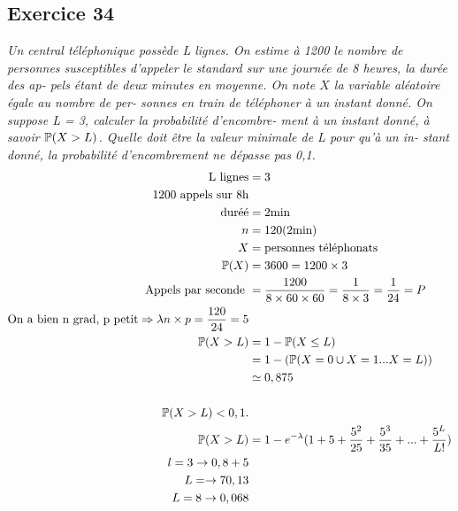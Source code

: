 \subsection*{Exercice 34 } %
\textit{Un central téléphonique possède L lignes. On estime à 1200 le nombre de personnes susceptibles d’appeler le standard sur une journée de 8 heures, la durée des ap- pels étant de deux minutes en moyenne.
On note $X$ la variable aléatoire égale au nombre de per- sonnes en train de téléphoner à un instant donné.
On suppose L = 3, calculer la probabilité d’encombre- ment à un instant donné, à savoir $\mathbb{P}(X > L)$.
Quelle doit être la valeur minimale de L pour qu’à un in- stant donné, la probabilité d’encombrement ne dépasse pas 0,1.}
\begin{align*}
    \text{L lignes} &= 3\\
    \text{1200 appels sur 8h}\\
    \text{duréé} &= 2\text{min}\\
    n &= 120 (2\text{min})\\
    X &= \text{personnes téléphonats}\\
    \mathbb{P}(X) &= 3600 = 1200 \times 3\\
    \text{Appels par seconde }&=
    \frac{1200}{8\times60\times60} = \frac{1}{8 \times 3} = \frac{1}{24} = P\\
    \text{On a bien n grad, p petit} \Rightarrow \lambda n \times p = \frac{120}{24} = 5\\
    \mathbb{P}(X >L) &= 1 - \mathbb{P}(X \leq L) \\
    &= 1 - (\mathbb{P}(X=0 \cup X =1 ...X=L))\\
    &\simeq 0,875\\
    \\
    \mathbb{P}(X >L) <0,1.\\
    \mathbb{P}(X>L) &= 1 - e^{- \lambda}(1+5+\frac{5^2}{25}+ \frac{5^3}{35}+ ...+ \frac{5^L}{L!})\\
    l = 3 \rightarrow  0,8 + 5\\
    L = \rightarrow 7 0,13\\
    L=8 \rightarrow  0,068
\end{align*}